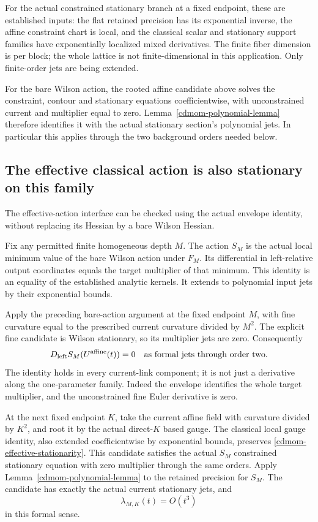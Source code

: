 \documentclass[11pt]{article}
\theoremstyle{remark}
\begin{document}
For the actual constrained stationary branch at a fixed
endpoint, these are established inputs: the flat retained
precision has its exponential inverse, the affine
constraint chart is local, and the classical scalar
and stationary support families have exponentially
localized mixed derivatives. The finite fiber dimension
is per block; the whole lattice is not finite-dimensional
in this application. Only finite-order jets are being
extended.

For the bare Wilson action, the rooted affine candidate
above solves the constraint, contour and stationary
equations coefficientwise, with unconstrained current
and multiplier equal to zero. Lemma~\ref{cdmom-polynomial-lemma}
therefore identifies it with the actual stationary
section's polynomial jets. In particular this applies
through the two background orders needed below.

\subsection{The effective classical action is also stationary on this family}
\label{cdmom-effective-section}

The effective-action interface can be checked using the
actual envelope identity, without replacing its Hessian
by a bare Wilson Hessian.

Fix any permitted finite homogeneous depth \(M\).
The action \(S_M\) is the actual local minimum value of
the bare Wilson action under \(F_M\). Its differential
in left-relative output coordinates equals the target
multiplier of that minimum. This identity is an equality
of the established analytic kernels. It extends to
polynomial input jets by their exponential bounds.

Apply the preceding bare-action argument at the fixed
endpoint \(M\), with fine curvature equal to the prescribed
current curvature divided by \(M^2\). The explicit fine
candidate is Wilson stationary, so its multiplier jets
are zero. Consequently
\begin{equation}
          D_{\rm left}S_M(U^{\rm affine}(t))=0
                 \quad\hbox{as formal jets through order two}.
 \label{cdmom-effective-stationarity}
\end{equation}
The identity holds in every current-link component;
it is not just a derivative along the one-parameter family.
Indeed the envelope identifies the whole target multiplier,
and the unconstrained fine Euler derivative is zero.

At the next fixed endpoint \(K\), take the current affine
field with curvature divided by \(K^2\), and root it by
the actual direct-\(K\) based gauge. The classical local
gauge identity, also extended coefficientwise by exponential
bounds, preserves \eqref{cdmom-effective-stationarity}.
This candidate satisfies the actual \(S_M\) constrained
stationary equation with zero multiplier through the same
orders. Apply Lemma~\ref{cdmom-polynomial-lemma} to the
retained precision for \(S_M\). The candidate has exactly
the actual current stationary jets, and
\begin{equation}
             \lambda_{M,K}(t)=O(t^3)
 \label{cdmom-multiplier-jets}
\end{equation}
in this formal sense.
\end{document}
